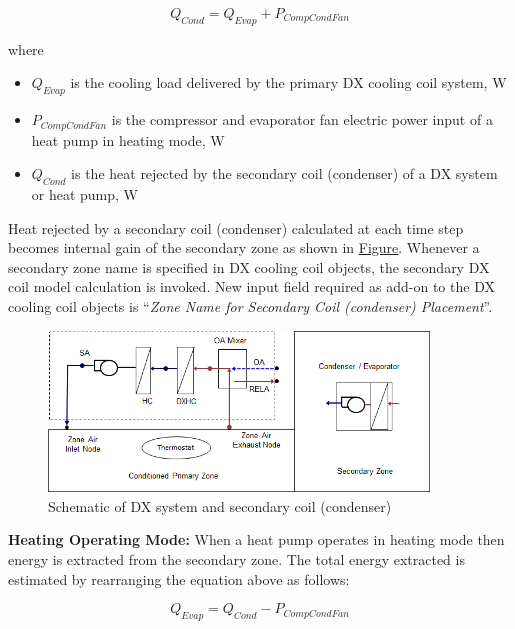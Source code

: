 \begin{equation}
  Q_{Cond} = Q_{Evap}+P_{CompCondFan}
\end{equation}

where

\begin{itemize}
\tightlist
\item
  \(Q_{Evap}\) is the cooling load delivered by the primary DX cooling coil system, W 
\item
  \(P_{CompCondFan}\) is the compressor and evaporator fan electric power input of a heat pump in heating mode, W
\item
  \(Q_{Cond}\) is the heat rejected by the secondary coil (condenser) of a DX system or heat pump, W
\end{itemize}

Heat rejected by a secondary coil (condenser) calculated at each time step becomes internal gain of the secondary zone as shown in \protect\hyperlink{SchematicDXAndSecondary}{Figure}. Whenever a secondary zone name is specified in DX cooling coil objects, the secondary DX coil model calculation is invoked. New input field required as add-on to the DX cooling coil objects is ``\emph{Zone Name for Secondary Coil (condenser) Placement}''.

\begin{figure}[hbtp]
\centering
\includegraphics[width=0.9\textwidth, height=0.9\textheight, keepaspectratio=true]{media/image8003.png}
\caption{Schematic of DX system and secondary coil (condenser) \protect \label{fig:schematic-of-dx-system-and-secondary-coil}}
\end{figure}

\textbf{Heating Operating Mode:} When a heat pump operates in heating mode then energy is extracted from the secondary zone. The total energy extracted is estimated by rearranging the equation above as follows:

\begin{equation}
Q_{Evap} = Q_{Cond} - P_{CompCondFan}
\end{equation}

